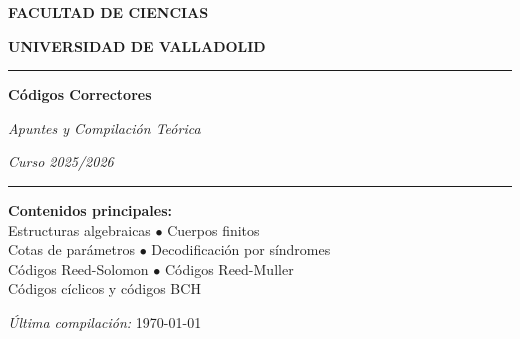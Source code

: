 \documentclass{article}
\begin{document}
 
 
\begin{titlepage}
    \centering
    \vspace*{1.2cm}
    
    {\color{azuloscuro}\Large\textbf{FACULTAD DE CIENCIAS} \par}
    \vspace{0.15cm}
    {\color{azuloscuro}\normalsize\textbf{UNIVERSIDAD DE VALLADOLID} \par}
    
    \vspace{4.5cm}
    
    {\color{azuloscuro}\noindent\rule{\textwidth}{2.8pt}}
    \vspace{0.9cm}
    
    {\color{azuloscuro}\Huge\bfseries Códigos Correctores \par}
    
    \vspace{0.7cm}
    
    {\Large\textit{Apuntes y Compilación Teórica} \par}
    \vspace{0.3cm}
    {\large\textit{Curso 2025/2026} \par}
    
    \vspace{0.9cm}
    {\color{azuloscuro}\noindent\rule{\textwidth}{2.8pt}}
    
    \vspace{2.5cm}
    
    {\normalsize\itshape
    \parbox{0.82\textwidth}{
        \centering
        \textbf{Contenidos principales:} \\[0.4cm]
        Estructuras algebraicas $\bullet$ Cuerpos finitos \\[0.2cm]
        Cotas de parámetros $\bullet$ Decodificación por síndromes \\[0.2cm]
        Códigos Reed-Solomon $\bullet$ Códigos Reed-Muller \\[0.2cm]
        Códigos cíclicos y códigos BCH
    }
    \par}
    
    \vfill
    
    \vspace*{1.8cm}
    {\small\color{azuloscuro}\textit{Última compilación:} \today}
    \vspace{0.5cm}
    
\end{titlepage}
 
\end{document}
